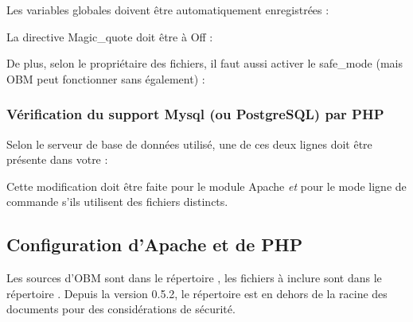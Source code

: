 Les variables globales doivent être automatiquement enregistrées : 


La directive Magic\_quote doit être à Off :


De plus, selon  le propriétaire des fichiers, il faut aussi activer le
safe\_mode (mais OBM peut fonctionner sans également) : 


\subsubsection{Vérification du support Mysql (ou PostgreSQL) par PHP}

Selon le serveur de base de données utilisé, une de ces deux lignes
doit être présente dans votre  : 


Cette modification doit être faite pour le module Apache
\emph{et} pour le mode ligne de commande s'ils utilisent des fichiers
 distincts.

\subsection{Configuration d'Apache et de PHP}

Les sources d'OBM sont dans le répertoire , les fichiers
à inclure sont dans le répertoire . Depuis la
version 0.5.2, le répertoire  est en dehors de la
racine des documents pour des considérations de sécurité.

